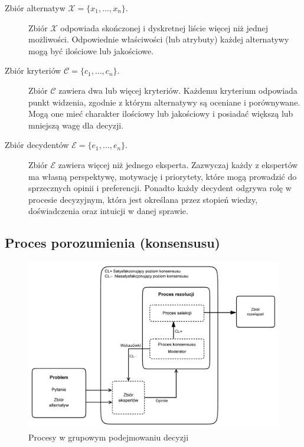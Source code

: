 \begin{description}
  \item[Zbiór alternatyw $ \mathcal{X} = \{ x_1, \dotsc, x_n \}.$] Zbiór
  $\mathcal{X}$ odpowiada skończonej i dyskretnej liście więcej niż jednej
  możliwości. Odpowiednie właściwości (lub atrybuty) każdej alternatywy mogą być
  ilościowe lub jakościowe.
  
  \item[Zbiór kryteriów $ \mathcal{C} = \{ c_1, \dotsc, c_n \}.$] Zbiór
  $\mathcal{C}$ zawiera dwa lub więcej kryteriów. Każdemu kryterium odpowiada
  punkt widzenia, zgodnie z którym alternatywy są oceniane i porównywane. Mogą
  one mieć charakter ilościowy lub jakościowy i posiadać większą lub mniejszą
  wagę dla decyzji.
  
  \item[Zbiór decydentów $ \mathcal{E} = \{ e_1, \dotsc, e_n \}.$] Zbiór
  $\mathcal{E}$ zawiera więcej niż jednego eksperta. Zazwyczaj każdy z ekspertów
  ma własną perspektywę, motywację i priorytety, które mogą prowadzić do
  sprzecznych opinii i preferencji. Ponadto każdy decydent odgrywa rolę w
  procesie decyzyjnym, która jest określana przez stopień wiedzy, doświadczenia
  oraz intuicji w danej sprawie.

\end{description}

\subsection{Proces porozumienia (konsensusu)}

\begin{figure}[ht]
  \includegraphics[width=\linewidth]
    {chapters/modelinggroupdecision/schemat_procesu-eps-converted-to.pdf}
  \caption{Procesy w grupowym podejmowaniu decyzji}
  \label{fig:Procesy_w_grupowym_podejmowaniu_decyzji}
\end{figure}

